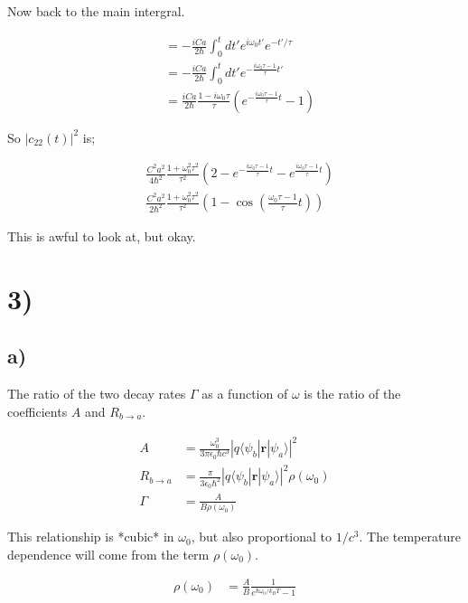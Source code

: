 \documentclass{article}
\newcommand{\p}[1]{\left(#1\right)}
\newcommand{\braket}[1]{\langle#1\rangle}
\begin{document}
Now back to the main intergral.

\begin{align*}
    &=-\frac{iCa}{2\hbar}\int_{0}^{t}dt'e^{i\omega_0t'}e^{-t'/\tau}\\[1em]
    &=-\frac{iCa}{2\hbar}\int_{0}^{t}dt'e^{-\frac{i\omega_0\tau-1}{\tau}t'}\\[1em]
    &=\frac{iCa}{2\hbar}\frac{1-i\omega_0\tau}{\tau}\p{e^{-\frac{i\omega_0\tau-1}{\tau}t}-1}
\end{align*}

So $|c_{22}(t)|^2$ is;

\begin{align*}
    &\frac{C^2a^2}{4\hbar^2}\frac{1+\omega_0^2\tau^2}{\tau^2}\p{2-e^{-\frac{i\omega_0\tau-1}{\tau}t}-e^{\frac{i\omega_0\tau-1}{\tau}t}}\\[1em]
    &\frac{C^2a^2}{2\hbar^2}\frac{1+\omega_0^2\tau^2}{\tau^2}\p{1-\cos(\frac{\omega_0\tau-1}{\tau}t)}
\end{align*}

This is awful to look at, but okay.

\section*{3)}
\subsection*{a)}
The ratio of the two decay rates $\Gamma$ as a function of $\omega$ is the ratio of the coefficients $A$ and $R_{b\rightarrow{a}}$.

\begin{align*}
    A&=\frac{\omega_0^3}{3\pi\epsilon_0\hbar{c}^3}|q\braket{\psi_b|\boldsymbol{r}|\psi_a}|^2\\[1em]
    R_{b\rightarrow{a}}&=\frac{\pi}{3\epsilon_0\hbar^2}|q\braket{\psi_b|\boldsymbol{r}|\psi_a}|^2\rho(\omega_0)\\[1em]
    \Gamma&=\frac{A}{B\rho(\omega_0)}
\end{align*}

This relationship is *cubic* in $\omega_0$, but also proportional to $1/c^3$. The temperature dependence will come from the term $\rho(\omega_0)$.

\begin{align*}
    \rho(\omega_0)&=\frac{A}{B}\frac{1}{e^{\hbar\omega_0/k_BT}-1}
\end{align*}
\end{document}
